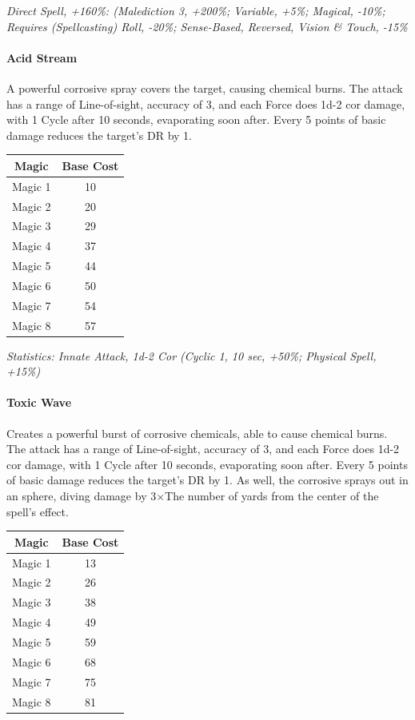 \begin{multicols*}{3}
	\textcolor{OliveGreen}{\textit{Direct Spell, +160\%: (Malediction 3, +200\%; Variable, +5\%; Magical, -10\%; Requires (Spellcasting) Roll, -20\%; Sense-Based, Reversed, Vision \& Touch, -15\%}}
	
	\paragraph{Acid Stream}
	
	A powerful corrosive spray covers the target, causing chemical burns. The attack has a range of Line-of-sight, accuracy of 3, and each Force does 1d-2 cor damage, with 1 Cycle after 10 seconds, evaporating soon after. Every 5 points of basic damage reduces the target's DR by 1.
	
	\begin{center}
		\begin{tabular}{|c|c|}
			\hline
			Magic & Base Cost \\
			\hline
			\hline
			Magic 1 & 10 \\
			Magic 2 & 20 \\
			Magic 3 & 29 \\
			Magic 4 & 37 \\
			Magic 5 & 44 \\
			Magic 6 & 50 \\
			Magic 7 & 54 \\
			Magic 8 & 57 \\
			\hline
		\end{tabular}
	\end{center}
	
	\textcolor{OliveGreen}{\textit{Statistics: Innate Attack, 1d-2 Cor (Cyclic 1, 10 sec, +50\%; Physical Spell, +15\%)}}
	
	\paragraph{Toxic Wave}
	
	Creates a powerful burst of corrosive chemicals, able to cause chemical burns. The attack has a range of Line-of-sight, accuracy of 3, and each Force does 1d-2 cor damage, with 1 Cycle after 10 seconds, evaporating soon after. Every 5 points of basic damage reduces the target's DR by 1. As well, the corrosive sprays out in an sphere, diving damage by 3\(\times\)The number of yards from the center of the spell's effect. 
	
	\begin{center}
		\begin{tabular}{|c|c|}
			\hline
			Magic & Base Cost \\
			\hline
			\hline
			Magic 1 & 13 \\
			Magic 2 & 26 \\
			Magic 3 & 38 \\
			Magic 4 & 49 \\
			Magic 5 & 59 \\
			Magic 6 & 68 \\
			Magic 7 & 75 \\
			Magic 8 & 81 \\
			\hline
		\end{tabular}
	\end{center}
	

\end{multicols*}

